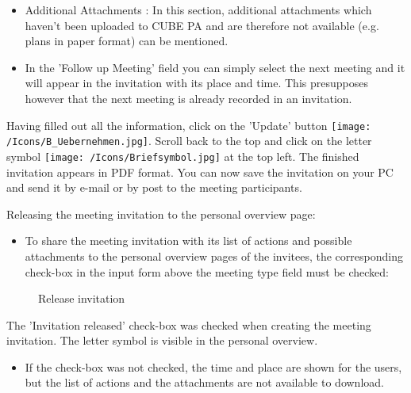 \begin{itemize}
\item 
Additional Attachments : In this section, additional attachments which haven't been uploaded to CUBE PA and are therefore not available (e.g. plans in paper format) can be mentioned.
\item 
In the 'Follow up Meeting' field you can simply select the next meeting and it will appear in the invitation with its place and time. This presupposes however that the next meeting is already recorded in an invitation.
\end{itemize}

Having filled out all the information, click on the 'Update' button \texttt{[image: /Icons/B\_Uebernehmen.jpg]}. \newline
Scroll back to the top and click on the letter symbol \texttt{[image: /Icons/Briefsymbol.jpg]} at the top left. The finished invitation appears in PDF format. You can now save the invitation on your PC and send it by e-mail or by post to the meeting participants.

\vspace{\baselineskip}

Releasing the meeting invitation to the personal overview page:

\begin{itemize}
\item
To share the meeting invitation with its list of actions and possible attachments to the personal overview pages of the invitees, the corresponding check-box in the input form above the meeting type field must be checked:
\end{itemize}

\begin{figure}[H]
\caption{Release invitation}
\end{figure}

\begin{small}
The 'Invitation released' check-box was checked when creating the meeting invitation. The letter symbol is visible in the personal overview.
\end{small}

\begin{itemize}
\item
If the check-box was not checked, the time and place are shown for the users, but the list of actions and the attachments are not available to download.
\end{itemize}

